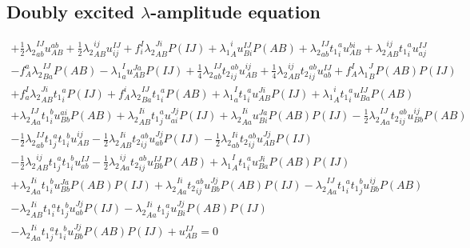 \subsection{Doubly excited $\lambda$-amplitude equation}

\begin{gather*}
+ \frac{1}{2}{\lambda_2}^{IJ}_{ab} u^{ab}_{AB}
+ \frac{1}{2}{\lambda_2}^{ij}_{AB} u^{IJ}_{ij}
+ f^{I}_{i} {\lambda_2}^{Ji}_{AB} P(IJ)
+ {\lambda_1}^{i}_{A} u^{IJ}_{Bi} P(AB)
+ {\lambda_2}^{IJ}_{ab} {t_1}^{a}_{i} u^{bi}_{AB}
+ {\lambda_2}^{ij}_{AB} {t_1}^{a}_{i} u^{IJ}_{aj} \\
- f^{a}_{A} {\lambda_2}^{IJ}_{Ba} P(AB)
- {\lambda_1}^{I}_{a} u^{Ja}_{AB} P(IJ)
+ \frac{1}{4}{\lambda_2}^{IJ}_{ab} {t_2}^{ab}_{ij} u^{ij}_{AB}
+ \frac{1}{4}{\lambda_2}^{ij}_{AB} {t_2}^{ab}_{ij} u^{IJ}_{ab}
+ f^{I}_{A} {\lambda_1}^{J}_{B} P(AB) P(IJ) \\
+ f^{I}_{a} {\lambda_2}^{Ji}_{AB} {t_1}^{a}_{i} P(IJ)
+ f^{i}_{A} {\lambda_2}^{IJ}_{Ba} {t_1}^{a}_{i} P(AB)
+ {\lambda_1}^{I}_{a}   {t_1}^{a}_{i} u^{Ji}_{AB} P(IJ)
+ {\lambda_1}^{i}_{A}   {t_1}^{a}_{i} u^{IJ}_{Ba} P(AB) \\
+ {\lambda_2}^{IJ}_{Aa} {t_1}^{b}_{i} u^{ai}_{Bb} P(AB)
+ {\lambda_2}^{Ii}_{AB} {t_1}^{a}_{j} u^{Jj}_{ai} P(IJ)
+ {\lambda_2}^{Ii}_{Aa} u^{Ja}_{Bi} P(AB) P(IJ)
- \frac{1}{2}{\lambda_2}^{IJ}_{Aa} {t_2}^{ab}_{ij} u^{ij}_{Bb} P(AB) \\
- \frac{1}{2}{\lambda_2}^{IJ}_{ab} {t_1}^{a}_{j} {t_1}^{b}_{i} u^{ij}_{AB}
- \frac{1}{2}{\lambda_2}^{Ii}_{AB} {t_2}^{ab}_{ij} u^{Jj}_{ab} P(IJ)
- \frac{1}{2}{\lambda_2}^{Ii}_{ab} {t_2}^{ab}_{ij} u^{Jj}_{AB} P(IJ) \\
- \frac{1}{2}{\lambda_2}^{ij}_{AB} {t_1}^{a}_{j} {t_1}^{b}_{i} u^{IJ}_{ab}
- \frac{1}{2}{\lambda_2}^{ij}_{Aa} {t_2}^{ab}_{ij} u^{IJ}_{Bb} P(AB)
+ {\lambda_1}^{I}_{A}   {t_1}^{a}_{i} u^{Ji}_{Ba} P(AB) P(IJ) \\
+ {\lambda_2}^{Ii}_{Aa} {t_1}^{b}_{i} u^{Ja}_{Bb} P(AB) P(IJ)
+ {\lambda_2}^{Ii}_{Aa} {t_2}^{ab}_{ij} u^{Jj}_{Bb} P(AB) P(IJ)
- {\lambda_2}^{IJ}_{Aa} {t_1}^{a}_{i} {t_1}^{b}_{j} u^{ij}_{Bb} P(AB) \\
- {\lambda_2}^{Ii}_{AB} {t_1}^{a}_{i} {t_1}^{b}_{j} u^{Jj}_{ab} P(IJ)
- {\lambda_2}^{Ii}_{Aa} {t_1}^{a}_{j} u^{Jj}_{Bi} P(AB) P(IJ) \\
- {\lambda_2}^{Ii}_{Aa} {t_1}^{a}_{j} {t_1}^{b}_{i} u^{Jj}_{Bb} P(AB) P(IJ)
+ u^{IJ}_{AB} = 0
\end{gather*}
